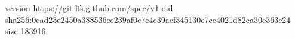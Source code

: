 version https://git-lfs.github.com/spec/v1
oid sha256:0cad23e2450a388536ee239af0c7e4c39acf345130e7ce4021d82ca30e363c24
size 183916
